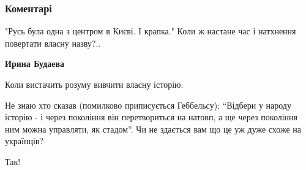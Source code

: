  
 
 
 
 
\subsubsection{Коментарі}
\label{sec:02_01_2021.fb.rabchinskij_sergej.1.malorossia_nazva.cmt}

\begin{itemize}
 
"Русь була одна з центром в Києві. І крапка." Коли ж настане час і натхнення повертати власну назву?..


\begin{itemize}
 
\textbf{Ирина Будаева} 

Коли вистачить розуму вивчити власну історію.

Не знаю хто сказав (помилково приписується Геббельсу): “Відбери у народу
історію - і через покоління він перетвориться на натовп, а ще через покоління
ним можна управляти, як стадом”. Чи не здається вам що це уж дуже схоже на
українців?
\end{itemize}

 
Так!

 

\end{itemize}
